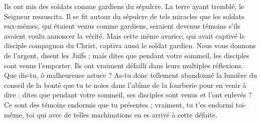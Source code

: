  Ils ont mis des soldats comme gardiens du sépulcre. La terre ayant tremblé, le Seigneur ressuscita. Il se fit autour du sépulcre de tels miracles que les soldats eux-mêmes, qui étaient venus comme gardiens, seraient devenus témoins s'ils avaient voulu annoncer la vérité. Mais cette même avarice, qui avait captivé le disciple compagnon du Christ, captiva aussi le soldat gardien. Nous vous donnons de l'argent, disent les Juifs ; mais dites que pendant votre sommeil, les disciples sont venus l'emporter. Ils ont vraiment défailli dans leurs multiples réflexions. Que dis-tu, ô malheureuse astuce ? As-tu donc tellement abandonné la lumière du conseil de la bonté que tu te noies dans l'abîme de la fourberie pour en venir à dire : dites que pendant votre sommeil, ses disciples sont venus et l'ont enlevés ? Ce sont des témoins endormis que tu présentes ; vraiment, tu t'es endormi toi-même, toi qui avec de telles machinations en es arrivé à cette défaite.